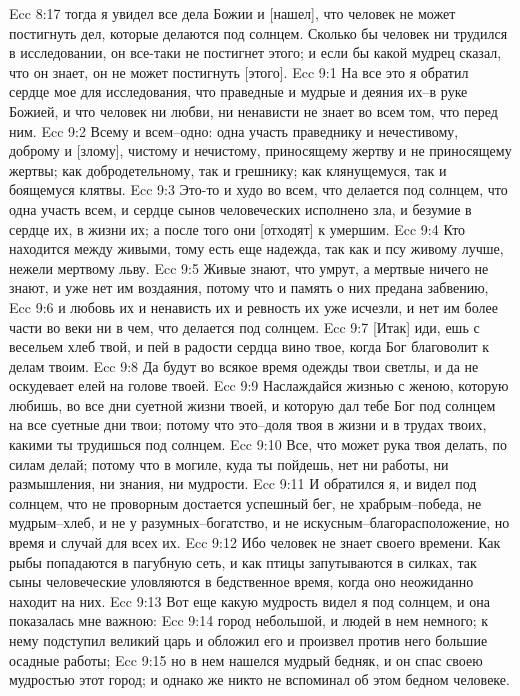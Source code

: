 Ecc 8:17  тогда я увидел все дела Божии и [нашел], что человек не может постигнуть дел, которые делаются под солнцем. Сколько бы человек ни трудился в исследовании, он все-таки не постигнет этого; и если бы какой мудрец сказал, что он знает, он не может постигнуть [этого].
Ecc 9:1  На все это я обратил сердце мое для исследования, что праведные и мудрые и деяния их--в руке Божией, и что человек ни любви, ни ненависти не знает во всем том, что перед ним.
Ecc 9:2  Всему и всем--одно: одна участь праведнику и нечестивому, доброму и [злому], чистому и нечистому, приносящему жертву и не приносящему жертвы; как добродетельному, так и грешнику; как клянущемуся, так и боящемуся клятвы.
Ecc 9:3  Это-то и худо во всем, что делается под солнцем, что одна участь всем, и сердце сынов человеческих исполнено зла, и безумие в сердце их, в жизни их; а после того они [отходят] к умершим.
Ecc 9:4  Кто находится между живыми, тому есть еще надежда, так как и псу живому лучше, нежели мертвому льву.
Ecc 9:5  Живые знают, что умрут, а мертвые ничего не знают, и уже нет им воздаяния, потому что и память о них предана забвению,
Ecc 9:6  и любовь их и ненависть их и ревность их уже исчезли, и нет им более части во веки ни в чем, что делается под солнцем.
Ecc 9:7  [Итак] иди, ешь с весельем хлеб твой, и пей в радости сердца вино твое, когда Бог благоволит к делам твоим.
Ecc 9:8  Да будут во всякое время одежды твои светлы, и да не оскудевает елей на голове твоей.
Ecc 9:9  Наслаждайся жизнью с женою, которую любишь, во все дни суетной жизни твоей, и которую дал тебе Бог под солнцем на все суетные дни твои; потому что это--доля твоя в жизни и в трудах твоих, какими ты трудишься под солнцем.
Ecc 9:10  Все, что может рука твоя делать, по силам делай; потому что в могиле, куда ты пойдешь, нет ни работы, ни размышления, ни знания, ни мудрости.
Ecc 9:11  И обратился я, и видел под солнцем, что не проворным достается успешный бег, не храбрым--победа, не мудрым--хлеб, и не у разумных--богатство, и не искусным--благорасположение, но время и случай для всех их.
Ecc 9:12  Ибо человек не знает своего времени. Как рыбы попадаются в пагубную сеть, и как птицы запутываются в силках, так сыны человеческие уловляются в бедственное время, когда оно неожиданно находит на них.
Ecc 9:13  Вот еще какую мудрость видел я под солнцем, и она показалась мне важною:
Ecc 9:14  город небольшой, и людей в нем немного; к нему подступил великий царь и обложил его и произвел против него большие осадные работы;
Ecc 9:15  но в нем нашелся мудрый бедняк, и он спас своею мудростью этот город; и однако же никто не вспоминал об этом бедном человеке.
